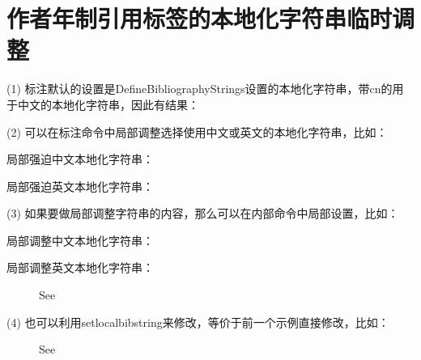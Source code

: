 \documentclass[twoside]{article}
\begin{document}
\section{作者年制引用标签的本地化字符串临时调整}

(1) 标注默认的设置是DefineBibliographyStrings设置的本地化字符串，带cn的用于中文的本地化字符串，因此有结果：

    {
    \cite{chu2004tushu}
    \cite{chen1980zhongguo}
    \cite{walls2013drought}
    \cite{betts2005aging}
    }

(2) 可以在标注命令中局部调整选择使用中文或英文的本地化字符串，比如：

    局部强迫中文本地化字符串：

    {
    \cite{chu2004tushu}
    \cite{chen1980zhongguo}
    \cite{walls2013drought}
    \cite{betts2005aging}
    }

    局部强迫英文本地化字符串：

    {
    \cite{chu2004tushu}
    \cite{chen1980zhongguo}
    \cite{walls2013drought}
    \cite{betts2005aging}}




(3) 如果要做局部调整字符串的内容，那么可以在内部命令中局部设置，比如：

    局部调整中文本地化字符串：

    {%
    \makeatletter{}\makeatother
    \cite{chu2004tushu}
    \cite{chen1980zhongguo}
    \cite{walls2013drought}
    \cite{betts2005aging}}


    局部调整英文本地化字符串：

    {%
    \makeatletter{}\makeatother
    \cite{chu2004tushu}
    \cite{chen1980zhongguo}
    \cite{walls2013drought}
    \cite{betts2005aging}}

\begin{figure}[!htbp]
  \centering
    {See{\makeatletter{}\makeatother\cite{walls2013drought}
    \cite{betts2005aging}}}\label{fig:bi:lang}
\end{figure}

(4) 也可以利用setlocalbibstring来修改，等价于前一个示例直接修改，比如：

\begin{figure}[!htbp]
  \centering
    {See{
    \cite{walls2013drought}
    \cite{betts2005aging}}}\label{fig:bi:lang}
\end{figure}




    
\end{document}
